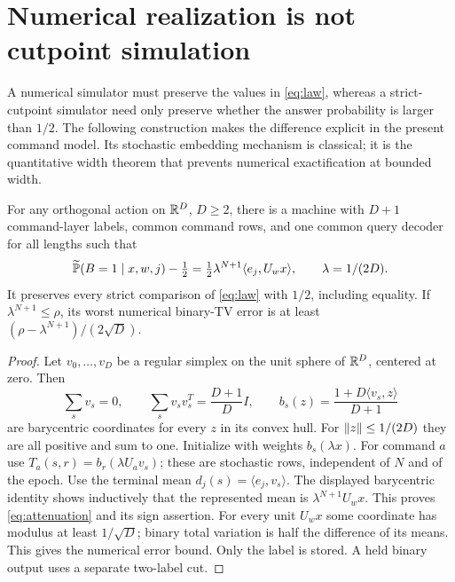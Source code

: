 \section{Numerical realization is not cutpoint simulation}
\label{sec:semantics}
A numerical simulator must preserve the values in \eqref{eq:law},
whereas a strict-cutpoint simulator need only preserve whether the
answer probability is larger than $1/2$. The following construction
makes the difference explicit in the present command model. Its
stochastic embedding mechanism is classical; it is the quantitative
width theorem that prevents numerical exactification at bounded width.

\begin{proposition}\label{prop:sign-simulator}
For any orthogonal action on $\mathbb R^D$, $D\ge2$, there is a machine
with $D+1$ command-layer labels, common command rows, and one common
query decoder for all lengths such that
\begin{equation}\label{eq:attenuation}
 \widetilde{\mathbb P}(B=1\mid x,w,j)-\tfrac12
  =\tfrac12\lambda^{N+1}\langle e_j,U_wx\rangle,
       \qquad\lambda=1/(2D).
\end{equation}
It preserves every strict comparison of \eqref{eq:law} with $1/2$,
including equality. If $\lambda^{N+1}\le\rho$, its worst numerical
binary-TV error is at least
$(\rho-\lambda^{N+1})/(2\sqrt D)$.
\end{proposition}
\begin{proof}
Let $v_0,\ldots,v_D$ be a regular simplex on the unit sphere of
$\mathbb R^D$, centered at zero. Then
\[
 \sum_sv_s=0,\qquad \sum_sv_sv_s^T=\frac{D+1}{D}I,
 \qquad
 b_s(z)=\frac{1+D\langle v_s,z\rangle}{D+1}
\]
are barycentric coordinates for every $z$ in its convex hull. For
$\lVert z\rVert\le1/(2D)$ they are all positive and sum to one.
Initialize with weights $b_s(\lambda x)$. For command $a$ use
$T_a(s,r)=b_r(\lambda U_av_s)$; these are stochastic rows, independent
of $N$ and of the epoch. Use the terminal mean $d_j(s)=\langle e_j,v_s\rangle$.
The displayed barycentric identity shows inductively that the represented
mean is $\lambda^{N+1}U_wx$. This proves \eqref{eq:attenuation} and
its sign assertion. For every unit $U_wx$ some coordinate has modulus
at least $1/\sqrt D$; binary total variation is half the difference
of its means. This gives the numerical error bound. Only the label
is stored. A held binary output uses a separate two-label cut.
\end{proof}

